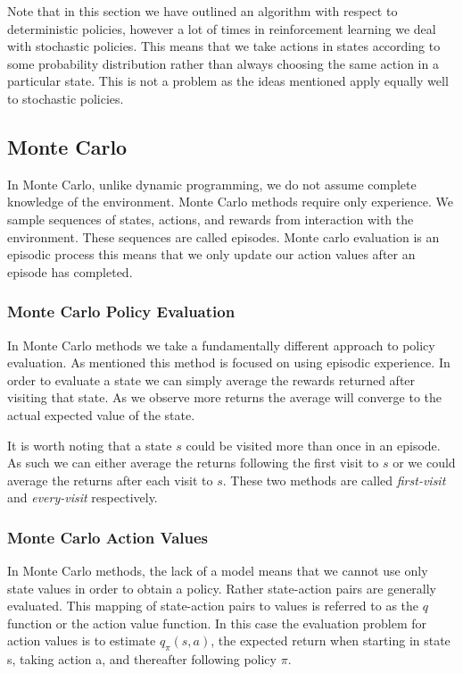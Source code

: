 Note that in this section we have outlined an algorithm with respect to deterministic policies,
however a lot of times in reinforcement learning we deal with stochastic policies.
This means that we take actions in states according to some probability distribution rather than always choosing
the same action in a particular state.
This is not a problem as the ideas mentioned apply equally well to stochastic policies.

\subsection{Monte Carlo}\label{subsec:mc}
In Monte Carlo, unlike dynamic programming, we do not assume complete knowledge of the environment.
Monte Carlo methods require only experience.
We sample sequences of states, actions, and rewards from interaction with the
environment\citep{sutton1998reinforcement}.
These sequences are called episodes.
Monte carlo evaluation is an episodic process this means that we only update our action values after an episode
has completed.

\subsubsection{Monte Carlo Policy Evaluation}
In Monte Carlo methods we take a fundamentally different approach to policy evaluation.
As mentioned this method is focused on using episodic experience.
In order to evaluate a state we can simply average the rewards returned after visiting that state.
As we observe more returns the average will converge to the actual expected value of the state.

It is worth noting that a state $s$ could be visited more than once in an episode.
As such we can either average the returns following the first visit to $s$ or we could average the returns
after each visit to $s$.
These two methods are called \textit{first-visit} and \textit{every-visit} respectively.

\subsubsection{Monte Carlo Action Values}
In Monte Carlo methods, the lack of a model means that we cannot use only state values in order to
obtain a policy.
Rather state-action pairs are generally evaluated.
This mapping of state-action pairs to values is referred to as the $q$ function or the action value function.
In this case the evaluation problem for action values is to estimate $q_\pi(s, a)$, the expected return when
starting in state s, taking action a, and thereafter following policy $\pi$\citep{sutton1998reinforcement}.

